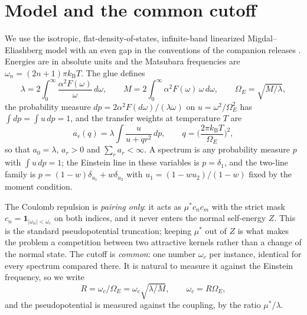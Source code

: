 \documentclass[11pt]{article}
\newcommand{\kb}{k_{\mathrm B}}
\newcommand{\OmE}{\Omega_E}
\newcommand{\muS}{\mu^{*}}
\theoremstyle{definition}
\theoremstyle{remark}
\begin{document}
\section{Model and the common cutoff}\label{sec:model}

We use the isotropic, flat-density-of-states, infinite-band linearized Migdal--Eliashberg
model with an even gap in the conventions of the companion releases
\cite{finiteband,univglue}. Energies are in absolute units and the Matsubara frequencies
are $\omega_n=(2n+1)\pi\kb T$. The glue defines
\begin{equation}\label{eq:const}
\lambda=2\int_0^\infty\frac{\alpha^2F(\omega)}{\omega}\,d\omega,\qquad
M=2\int_0^\infty\alpha^2F(\omega)\,\omega\,d\omega,\qquad
\OmE=\sqrt{M/\lambda},
\end{equation}
the probability measure $dp=2\alpha^2F(d\omega)/(\lambda\omega)$ on
$u=\omega^2/\OmE^2$ has $\int dp=\int u\,dp=1$, and the transfer weights at temperature
$T$ are
\begin{equation}\label{eq:transfers}
a_r(q)=\lambda\int\frac{u}{u+qr^2}\,dp,\qquad q=\Big(\frac{2\pi\kb T}{\OmE}\Big)^2,
\end{equation}
so that $a_0=\lambda$, $a_r>0$ and $\sum_r a_r<\infty$. A spectrum is any probability
measure $p$ with $\int u\,dp=1$; the Einstein line in these variables is
$p=\delta_1$, and the two-line family is $p=(1-w)\delta_{u_1}+w\delta_{u_2}$ with
$u_1=(1-wu_2)/(1-w)$ fixed by the moment condition.

The Coulomb repulsion is \emph{pairing only}: it acts as $\muS c_nc_m$ with the strict
mask $c_n=\mathbf 1_{|\omega_n|<\omega_c}$ on both indices, and it never enters the normal
self-energy $Z$. This is the standard pseudopotential truncation; keeping $\muS$ out of
$Z$ is what makes the problem a competition between two attractive kernels rather than a
change of the normal state. The cutoff is \emph{common}: one number $\omega_c$ per
instance, identical for every spectrum compared there. It is natural to measure it
against the Einstein frequency, so we write
\begin{equation}\label{eq:R}
R=\omega_c/\OmE=\omega_c\sqrt{\lambda/M},\qquad \omega_c=R\OmE,
\end{equation}
and the pseudopotential is measured against the coupling, by the ratio
$\muS/\lambda$.
\end{document}

